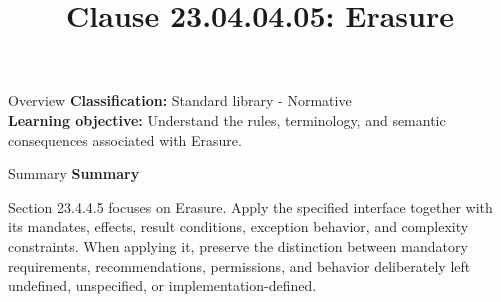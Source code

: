 \documentclass[10pt,letterpaper]{article}
\title{Clause 23.04.04.05: Erasure}
\author{}
\date{}
\begin{document}
\maketitle
\begin{CornellOverviewBox}{Overview}
\textbf{Classification:} Standard library - Normative\\[2pt]
\textbf{Learning objective:} Understand the rules, terminology, and semantic consequences associated with Erasure.
\end{CornellOverviewBox}\begin{CornellSummaryBox}{Summary}
{\sffamily\bfseries\color{Accent} Summary}\par\vspace{3pt}Section 23.4.4.5 focuses on Erasure. Apply the specified interface together with its mandates, effects, result conditions, exception behavior, and complexity constraints. When applying it, preserve the distinction between mandatory requirements, recommendations, permissions, and behavior deliberately left undefined, unspecified, or implementation-defined.
\end{CornellSummaryBox}
\end{document}

